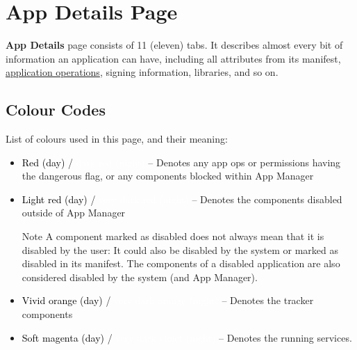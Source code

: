 \section{App Details Page}\label{sec:app-details-page} %
\textbf{App Details} page consists of 11 (eleven) tabs. It describes almost every bit of information an application
can have, including all attributes from its manifest, \hyperref[ch:app-ops]{application operations}, signing
information, libraries, and so on.

\subsection{Colour Codes}\label{subsec:app-details-colour-codes} %
List of colours used in this page, and their meaning:
\begin{itemize}
    \item \colorbox{AMRed}{\textcolor{black}{Red (day)}} / \colorbox{AMDarkRed}{\textcolor{white}{dark red (night)}}
    -- Denotes any app ops or permissions having the dangerous flag, or any components blocked within App Manager

    \item \colorbox{AMLightRed}{\textcolor{black}{Light red (day)}} / \colorbox{AMVeryDarkRed}{\textcolor{white}{very
    dark red (night)}} -- Denotes the components disabled outside of App Manager

    \begin{tip}{Note}
        A component marked as disabled does not always mean that it is disabled by the user: It could also be disabled
        by the system or marked as disabled in its manifest. The components of a disabled application are also
        considered disabled by the system (and App Manager).
    \end{tip}

    \item \colorbox{AMVividOrange}{\textcolor{black}{Vivid orange (day)}} / \colorbox{AMVeryDarkOrange}{
        \textcolor{white}{very dark orange (night)}} -- Denotes the tracker components

    \item \colorbox{AMSoftMagenta}{\textcolor{black}{Soft magenta (day)}} / \colorbox{AMVeryDarkViolet}{
        \textcolor{white}{very dark violet (night)}} -- Denotes the running services.
\end{itemize}

